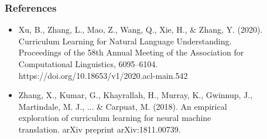 \documentclass{beamer}
\begin{document}
\begin{frame}
	\frametitle{References}
	\begin{itemize}
		\item Xu, B., Zhang, L., Mao, Z., Wang, Q., Xie, H., \& Zhang, Y. (2020). \\\hspace{1cm}Curriculum Learning for
		Natural Language Understanding. \\\hspace{1cm}Proceedings of the 58th Annual Meeting of the
		Association for \\\hspace{1cm}Computational Linguistics, 6095–6104.
		\\\hspace{1cm}https://doi.org/10.18653/v1/2020.acl-main.542
		\item Zhang, X., Kumar, G., Khayrallah, H., Murray, K., Gwinnup, J., \\\hspace{1cm}Martindale, M. J., ... \&
		Carpuat, M. (2018). An empirical \\\hspace{1cm}exploration of curriculum learning for neural
		machine \\\hspace{1cm}translation. arXiv preprint arXiv:1811.00739.
	\end{itemize}
\end{frame}
\end{document}

